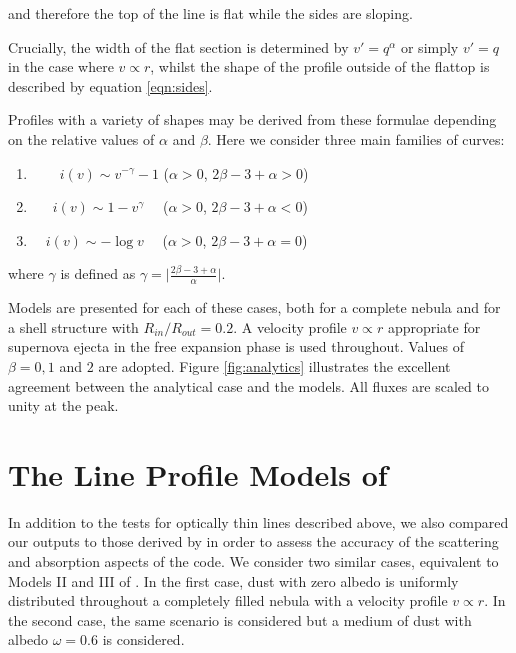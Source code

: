 \noindent and therefore the top of the line is flat while the sides are 
sloping.

Crucially, the width of the flat section is determined by $v'=q^\alpha$ or 
simply $v'=q$ in the case where $v \propto r$, whilst the shape of the 
profile outside of the flattop is described by equation \ref{eqn:sides}.

Profiles with a variety of shapes may be derived from these formulae 
depending on the relative values of $\alpha$ and $\beta$.  Here we 
consider three main families of curves:


\begin{enumerate}\parskip3pt

	\item \ \ $\quad i(v)  \sim v^{-\gamma}-1$ \quad ($\alpha>0$, $2\beta-3+\alpha>0$)
	\item \ $\quad i(v)  \sim 1-v^\gamma$ \quad \ \ ($\alpha>0$, $2\beta-3+\alpha<0$)
	\item  $\quad i(v) \sim -\log v$ \quad \ \ ($\alpha>0$, $2\beta-3+\alpha=0$)

\end{enumerate}


\noindent where $\gamma$ is defined as $\gamma= \lvert 
\frac{2\beta-3+\alpha}{\alpha} \rvert$.

Models are presented for each of these cases, both for a 
complete nebula and for a shell structure with $R_{in}/R_{out}=0.2$.  
A velocity profile $v \propto r$ appropriate for supernova ejecta in the free 
expansion phase is used throughout.  Values of $\beta = 0, 1$ and $2$ are 
adopted.  Figure \ref{fig:analytics} illustrates the excellent agreement between 
the analytical case and the models.  All fluxes are scaled to unity at the peak.

\section{The Line Profile Models of \citet{Lucy1989}}
\label{opt_thick_testing}

In addition to the tests for optically thin lines described above, we also 
compared our outputs to those derived by \citet{Lucy1989} in order to 
assess the accuracy of the scattering and absorption aspects of the code.  
We consider two similar cases, equivalent to Models II and III of 
\citet{Lucy1989}. In the first case, dust with zero albedo is 
uniformly distributed throughout a completely filled nebula with a velocity profile 
$v \propto r$.  In the second case, the same scenario is considered but a 
medium of dust with albedo $\omega =0.6$ is considered.

